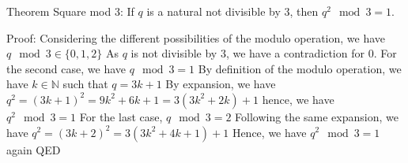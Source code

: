 Theorem Square mod 3:
If $q$ is a natural not divisible by $3$, then $q^2 \mod 3 = 1$.


Proof:
Considering the different possibilities of the modulo operation, we have $q \mod 3 \in \{ 0, 1, 2 \}$
As $q$ is not divisible by $3$, we have a contradiction for $0$.
For the second case, we have $q \mod 3 = 1$
    By definition of the modulo operation, we have $k \in \mathbb{N}$ such that $q = 3k + 1$
    By expansion, we have $q^2 = (3k+1)^2 = 9k^2+6k+1 = 3(3k^2 + 2k) + 1$
    hence, we have $q^2 \mod 3 = 1$
For the last case, $q \mod 3 = 2$
    Following the same expansion, we have $q^2 = (3k+2)^2 = 3(3k^2+4k+1) +1$
    Hence, we have $q^2 \mod 3 = 1$ again
QED